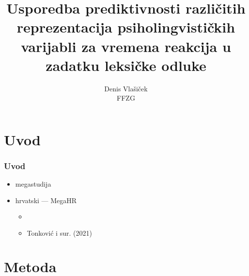 \documentclass[aspectratio=169]{beamer}
\title[]{Usporedba prediktivnosti različitih reprezentacija psiholingvističkih
    varijabli za vremena reakcija u zadatku leksičke odluke}
\author[]{\tiny Denis Vlašiček\\[1em]
    FFZG}
\date{}
\begin{document}
\begin{frame}
    \titlepage

    \centering
\end{frame}

\section{Uvod}

\begingroup

    \begin{frame}
        \frametitle{Uvod}

        \begin{itemize}
            \setlength{\itemsep}{2em}

            \item megastudija

            \item hrvatski --- MegaHR

            \begin{itemize}
                \item
                    \citet{peti-stanticCroatianPsycholinguisticDatabase2021}
                \item Tonković i sur. (2021)
            \end{itemize}

        \end{itemize}
        
    \end{frame}
\endgroup

\section{Metoda}

\begingroup
\end{document}
